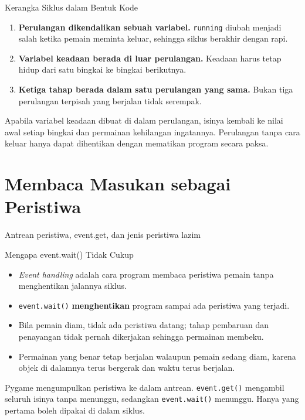 \documentclass[aspectratio=169,10pt]{beamer}
\begin{document}
\begin{frame}{Kerangka Siklus dalam Bentuk Kode}
\begin{enumerate}
  \item \textbf{Perulangan dikendalikan sebuah variabel.} \texttt{running}
        diubah menjadi salah ketika pemain meminta keluar, sehingga siklus
        berakhir dengan rapi.
  \item \textbf{Variabel keadaan berada di luar perulangan.} Keadaan harus
        tetap hidup dari satu bingkai ke bingkai berikutnya.
  \item \textbf{Ketiga tahap berada dalam satu perulangan yang sama.} Bukan
        tiga perulangan terpisah yang berjalan tidak serempak.
\end{enumerate}
\begin{kotak}
Apabila variabel keadaan dibuat di dalam perulangan, isinya kembali ke nilai
awal setiap bingkai dan permainan kehilangan ingatannya. Perulangan tanpa cara
keluar hanya dapat dihentikan dengan mematikan program secara paksa.
\end{kotak}
\end{frame}

\section{Membaca Masukan sebagai Peristiwa}
  {Antrean peristiwa, event.get, dan jenis peristiwa lazim}

\begin{frame}{Mengapa event.wait() Tidak Cukup}
\begin{itemize}
  \item \emph{Event handling} adalah cara program membaca peristiwa pemain
        tanpa menghentikan jalannya siklus.
  \item \texttt{event.wait()} \textbf{menghentikan} program sampai ada
        peristiwa yang terjadi.
  \item Bila pemain diam, tidak ada peristiwa datang; tahap pembaruan dan
        penayangan tidak pernah dikerjakan sehingga permainan membeku.
  \item Permainan yang benar tetap berjalan walaupun pemain sedang diam,
        karena objek di dalamnya terus bergerak dan waktu terus berjalan.
\end{itemize}
\begin{peringatan}
Pygame mengumpulkan peristiwa ke dalam antrean. \texttt{event.get()} mengambil
seluruh isinya tanpa menunggu, sedangkan \texttt{event.wait()} menunggu.
Hanya yang pertama boleh dipakai di dalam siklus.
\end{peringatan}
\end{frame}
\end{document}
